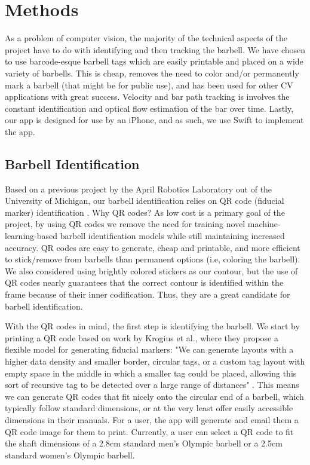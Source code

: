 \documentclass[10pt,twocolumn]{article}
\begin{document}
\section{Methods}
As a problem of computer vision, the majority of the technical aspects of the project have to do with identifying and then tracking the barbell.
We have chosen to use barcode-esque barbell tags which are easily printable and placed on a wide variety of barbells. 
This is cheap, removes the need to color and/or permanently mark a barbell (that might be for public use), and has been used for other CV applications with great success. 
Velocity and bar path tracking is involves the constant identification and optical flow estimation of the bar over time.
Lastly, our app is designed for use by an iPhone, and as such, we use Swift to implement the app.

\subsection{Barbell Identification}
Based on a previous project by the April Robotics Laboratory out of the University of Michigan, our barbell identification relies on QR code (fiducial marker) identification \cite{Wang2016}. 
Why QR codes? 
As low cost is a primary goal of the project, by using QR codes we remove the need for training novel machine-learning-based barbell identification models while still maintaining increased accuracy. 
QR codes are easy to generate, cheap and printable, and more efficient to stick/remove from barbells than permanent options (i.e, coloring the barbell). 
We also considered using brightly colored stickers as our contour, but the use of QR codes nearly guarantees that the correct contour is identified within the frame because of their inner codification.
Thus, they are a great candidate for barbell identification. \par

With the QR codes in mind, the first step is identifying the barbell. 
We start by printing a QR code based on work by Krogius et al., where they propose a flexible model for generating fiducial markers: 
"We can generate layouts with a higher data density and smaller border, circular tags, or a custom tag layout with empty space in the middle in which a smaller tag could be placed, allowing this sort of recursive tag to be detected over a large range of distances" \cite{Krogius2019}.
This means we can generate QR codes that fit nicely onto the circular end of a barbell, which typically follow standard dimensions, or at the very least offer easily accessible dimensions in their manuals.
For a user, the app will generate and email them a QR code image for them to print.
Currently, a user can select a QR code to fit the shaft dimensions of a 2.8cm standard men's Olympic barbell or a 2.5cm standard women's Olympic barbell.\par
\end{document}
